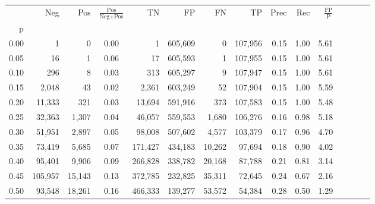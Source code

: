 \begin{tabular}{rrrcrrrrrrrrrrr}
\toprule
{} &      Neg &     Pos & $\frac{\text{Pos}}{\text{Neg}+\text{Pos}}$ &       TN &       FP &       FN &       TP &  Prec &   Rec & $\frac{\text{FP}}{\text{P}}$ \\
p    &          &         &                                            &          &          &          &          &       &       &                              \\
\midrule
0.00 &        1 &       0 &                                       0.00 &        1 &  605,609 &        0 &  107,956 &  0.15 &  1.00 &                         5.61 \\
0.05 &       16 &       1 &                                       0.06 &       17 &  605,593 &        1 &  107,955 &  0.15 &  1.00 &                         5.61 \\
0.10 &      296 &       8 &                                       0.03 &      313 &  605,297 &        9 &  107,947 &  0.15 &  1.00 &                         5.61 \\
0.15 &    2,048 &      43 &                                       0.02 &    2,361 &  603,249 &       52 &  107,904 &  0.15 &  1.00 &                         5.59 \\
0.20 &   11,333 &     321 &                                       0.03 &   13,694 &  591,916 &      373 &  107,583 &  0.15 &  1.00 &                         5.48 \\
0.25 &   32,363 &   1,307 &                                       0.04 &   46,057 &  559,553 &    1,680 &  106,276 &  0.16 &  0.98 &                         5.18 \\
0.30 &   51,951 &   2,897 &                                       0.05 &   98,008 &  507,602 &    4,577 &  103,379 &  0.17 &  0.96 &                         4.70 \\
0.35 &   73,419 &   5,685 &                                       0.07 &  171,427 &  434,183 &   10,262 &   97,694 &  0.18 &  0.90 &                         4.02 \\
0.40 &   95,401 &   9,906 &                                       0.09 &  266,828 &  338,782 &   20,168 &   87,788 &  0.21 &  0.81 &                         3.14 \\
0.45 &  105,957 &  15,143 &                                       0.13 &  372,785 &  232,825 &   35,311 &   72,645 &  0.24 &  0.67 &                         2.16 \\
0.50 &   93,548 &  18,261 &                                       0.16 &  466,333 &  139,277 &   53,572 &   54,384 &  0.28 &  0.50 &                         1.29 \\

\end{tabular}

